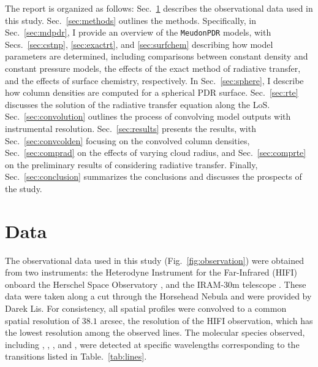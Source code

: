 \documentclass[12pt,a4paper]{article}
\begin{document}
The report is organized as follows: Sec.~\ref{sec:data} describes the observational data used in this study. Sec.~\ref{sec:methods} outlines the methods. Specifically, in Sec.~\ref{sec:mdpdr}, I provide an overview of the \texttt{MeudonPDR} models, with Secs.~\ref{sec:cstnp}, \ref{sec:exactrt}, and \ref{sec:surfchem} describing how model parameters are determined, including comparisons between constant density and constant pressure models, the effects of the exact method of radiative transfer, and the effects of surface chemistry, respectively. In Sec.~\ref{sec:sphere}, I describe how column densities are computed for a spherical PDR surface. Sec.~\ref{sec:rte} discusses the solution of the radiative transfer equation along the LoS. Sec.~\ref{sec:convolution} outlines the process of convolving model outputs with instrumental resolution. Sec.~\ref{sec:results} presents the results, with Sec.~\ref{sec:convcolden} focusing on the convolved column densities, Sec.~\ref{sec:comprad} on the effects of varying cloud radius, and Sec.~\ref{sec:comprte} on the preliminary results of considering radiative transfer. Finally, Sec.~\ref{sec:conclusion} summarizes the conclusions and discusses the prospects of the study.

\section{Data} \label{sec:data}
The observational data used in this study (Fig.~\ref{fig:observation}) were obtained from two instruments: the Heterodyne Instrument for the Far-Infrared (HIFI) \parencite{deGraauw2010} onboard the Herschel Space Observatory \parencite{Pilbratt2010}, and the IRAM-30m telescope \parencite{Baars1987}. These data were taken along a cut through the Horsehead Nebula and were provided by Darek Lis. For consistency, all spatial profiles were convolved to a common spatial resolution of $38.1$ arcsec, the resolution of the HIFI  observation, which has the lowest resolution among the observed lines.  The molecular species observed, including , , , and , were detected at specific wavelengths corresponding to the transitions listed in Table.~\ref{tab:lines}.
\end{document}
